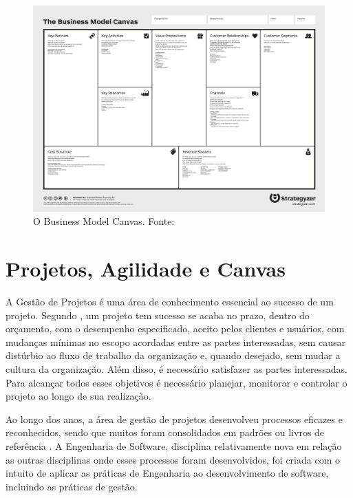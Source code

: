 \documentclass[a4]{report}
\newcommand{\othersize}{0.7\linewidth}
\begin{document}
\begin{figure}
    \centering
    \includegraphics[width=\othersize]{imagens/BMC.png}
    \caption{O Business Model Canvas. Fonte: \citet{osterwalder2010business}}
    \label{fig:bmc}
\end{figure}


\section{Projetos, Agilidade e Canvas}

A Gestão de Projetos é uma área de conhecimento essencial ao sucesso de um projeto. Segundo \citet{kerzner:12ed}, um projeto tem sucesso se
acaba no prazo, dentro do orçamento, com o desempenho especificado, aceito pelos clientes e usuários, com mudanças mínimas no escopo acordadas entre as partes interessadas, sem causar distúrbio ao fluxo de trabalho da organização e, quando desejado, sem mudar a cultura da organização. Além disso, é necessário satisfazer as partes interessadas\citep{pmbok:6}. Para alcançar todos esses objetivos é necessário planejar, monitorar e controlar o projeto ao longo de sua realização.

Ao longo dos anos, a área de gestão de projetos desenvolveu processos eficazes e reconhecidos, sendo que muitos foram consolidados em padrões ou livros de referência \citep{pmbok:6,kerzner:12ed}. A Engenharia de Software, disciplina relativamente nova em relação as outras disciplinas onde esses processos foram desenvolvidos, foi criada com o intuito de aplicar as práticas de Engenharia ao desenvolvimento de software, incluindo as práticas de gestão\citep{naur:randell:1968,pressman:2019,ieee_computer_society_guide_2014}.
\end{document}
